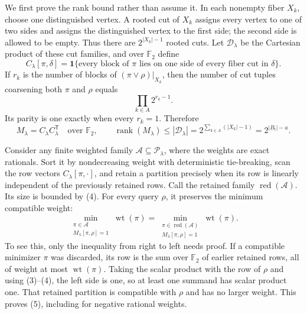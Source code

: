 We first prove the rank bound rather than assume it.  In each nonempty fiber \(X_k\), choose one distinguished vertex.  A rooted cut of \(X_k\) assigns every vertex to one of two sides and assigns the distinguished vertex to the first side; the second side is allowed to be empty.  Thus there are \(2^{|X_k|-1}\) rooted cuts.  Let \(\mathscr D_\lambda\) be the Cartesian product of these cut families, and over \(\mathbb F_2\) define
\[
 C_\lambda[\pi,\delta]
 =\mathbf 1\{\text{every block of }\pi\text{ lies on one side of every
 fiber cut in }\delta\}.
\]
If \(r_k\) is the number of blocks of \((\pi\vee\rho)|_{X_k}\), then the number of cut tuples coarsening both \(\pi\) and \(\rho\) equals
\[
 \prod_{k\in A}2^{r_k-1}.
\]
Its parity is one exactly when every \(r_k=1\).  Therefore
\[
 M_\lambda=C_\lambda C_\lambda^{\mathsf T}\quad\text{over }\mathbb F_2,
 \qquad
 \operatorname{rank}(M_\lambda)
 \le |\mathscr D_\lambda|
 =2^{\sum_{k\in A}(|X_k|-1)}
 =2^{|B_t|-a}.
\tag{4}
\]

Consider any finite weighted family \(\mathscr A\subseteq\mathscr P_\lambda\), where the weights are exact rationals.  Sort it by nondecreasing weight with deterministic tie-breaking, scan the row vectors \(C_\lambda[\pi,\cdot]\), and retain a partition precisely when its row is linearly independent of the previously retained rows.  Call the retained family \(\operatorname{red}(\mathscr A)\).  Its size is bounded by (4).  For every query \(\rho\), it preserves the minimum compatible weight:
\[
 \min_{\substack{\pi\in\mathscr A\\M_\lambda[\pi,\rho]=1}}
       \operatorname{wt}(\pi)
 =
 \min_{\substack{\pi\in\operatorname{red}(\mathscr A)\\
                  M_\lambda[\pi,\rho]=1}}
       \operatorname{wt}(\pi).
\tag{5}
\]
To see this, only the inequality from right to left needs proof.  If a compatible minimizer \(\pi\) was discarded, its row is the sum over \(\mathbb F_2\) of earlier retained rows, all of weight at most \(\operatorname{wt}(\pi)\).  Taking the scalar product with the row of \(\rho\) and using (3)--(4), the left side is one, so at least one summand has scalar product one.  That retained partition is compatible with \(\rho\) and has no larger weight.  This proves (5), including for negative rational weights.

